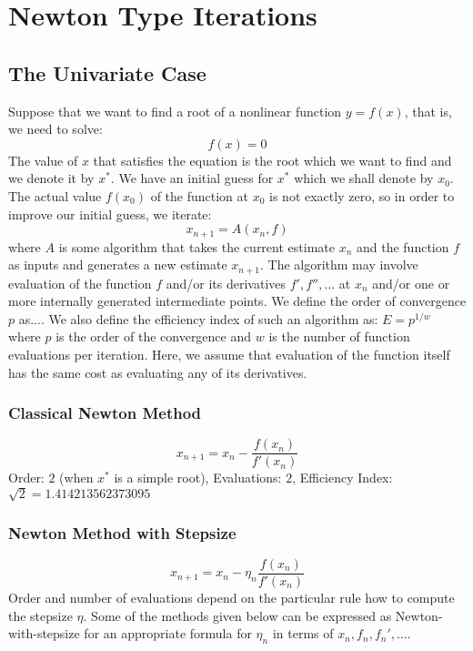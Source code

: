\section{Newton Type Iterations}

\subsection{The Univariate Case}

Suppose that we want to find a root of a nonlinear function $y = f(x)$, that is, we need to solve:
\begin{equation}
f(x) = 0
\end{equation}
The value of $x$ that satisfies the equation is the root which we want to find and we denote it by $x^*$. We have an initial guess for $x^*$ which we shall denote by $x_0$. The actual value $f(x_0)$ of the function at $x_0$ is not exactly zero, so in order to improve our initial guess, we iterate:
\begin{equation}
 x_{n+1} = A(x_n, f)
\end{equation}
where $A$ is some algorithm that takes the current estimate $x_n$ and the function $f$ as inputs and generates a new estimate $x_{n+1}$. The algorithm may involve evaluation of the function $f$ and/or its derivatives $f', f'', \ldots$ at $x_n$ and/or one or more internally generated intermediate points. We define the order of convergence $p$ as....
We also define the efficiency index of such an algorithm as: $E = p^{1/w}$ where $p$ is the order of the convergence and $w$ is the number of function evaluations per iteration. Here, we assume that evaluation of the function itself has the same cost as evaluating any of its derivatives.

\subsubsection{Classical Newton Method}
\begin{equation}
 x_{n+1} = x_n - \frac{f(x_n)}{f'(x_n)}
\end{equation}
Order: $2$ (when $x^*$ is a simple root), Evaluations: $2$, Efficiency Index: $\sqrt{2} = 1.414213562373095$

\subsubsection{Newton Method with Stepsize}
\begin{equation}
 x_{n+1} = x_n - \eta_n \frac{f(x_n)}{f'(x_n)}
\end{equation}
Order and number of evaluations depend on the particular rule how to compute the stepsize $\eta$. Some of the methods given below can be expressed as Newton-with-stepsize for an appropriate formula for $\eta_n$ in terms of $x_n, f_n, f_n', \ldots$.


